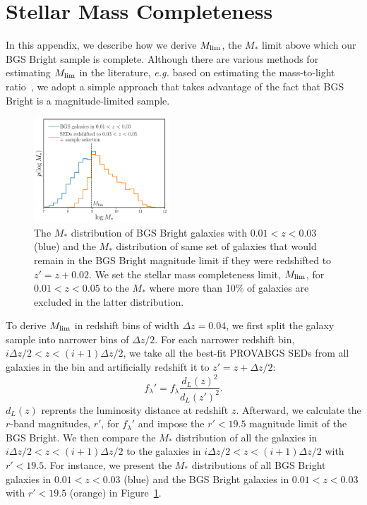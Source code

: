 \section{Stellar Mass Completeness} \label{sec:mscomp}
In this appendix, we describe how we derive $M_{\rm lim}$, the $M_*$ limit
above which our BGS Bright sample is complete. 
Although there are various methods for estimating $M_{\rm lim}$ in the
literature, \emph{e.g.} based on estimating the mass-to-light
ratio~\citep{pozzetti2010, moustakas2013}, we adopt a simple approach that
takes advantage of the fact that BGS Bright is a magnitude-limited sample. 

\begin{figure}
\begin{center}
    \includegraphics[width=0.45\textwidth]{figs/psmf_logMstar_comp_demo.pdf}
    \caption{
        The $M_*$ distribution of BGS Bright galaxies with $0.01 < z < 0.03$
        (blue) and the $M_*$ distribution of same set of galaxies that would
        remain in the BGS Bright magnitude limit if they were redshifted to 
        $z' = z + 0.02$. 
        We set the stellar mass completeness limit, $M_{\rm lim}$, for $0.01 <
        z < 0.05$ to the $M_*$ where more than 10\% of galaxies are excluded in
        the latter distribution. 
    }\label{fig:ms_comp0}
\end{center}
\end{figure}

To derive $M_{\rm lim}$ in redshift bins of width $\Delta z=0.04$, we first
split the galaxy sample into narrower bins of $\Delta z/2$. 
For each narrower redshift bin, $i \Delta z/2 < z < (i+1) \Delta z/2$, we take
all the best-fit {\sc PROVABGS} SEDs from all  galaxies in the bin and
artificially redshift it to $z' = z + \Delta z/2$:
\begin{equation}
    f_\lambda' = f_\lambda \frac{d_L(z)^2}{d_L(z')^2}.
\end{equation} 
$d_L(z)$ reprents the luminosity distance at redshift $z$. 
Afterward, we calculate the $r$-band magnitudes, $r'$, for $f_\lambda'$ and
impose the $r' < 19.5$ magnitude limit of the BGS Bright. 
We then compare the $M_*$ distribution of all the galaxies in 
$i \Delta z/2 < z < (i+1) \Delta z/2$ to the galaxies in 
$i \Delta z/2 < z < (i+1) \Delta z/2$ with $r' < 19.5$.
For instance,  we present the $M_*$ distributions of all BGS
Bright galaxies in $0.01 < z < 0.03$ (blue) and the BGS Bright galaxies in
$0.01 < z < 0.03$ with $r' < 19.5$ (orange) in Figure~\ref{fig:ms_comp0}.


